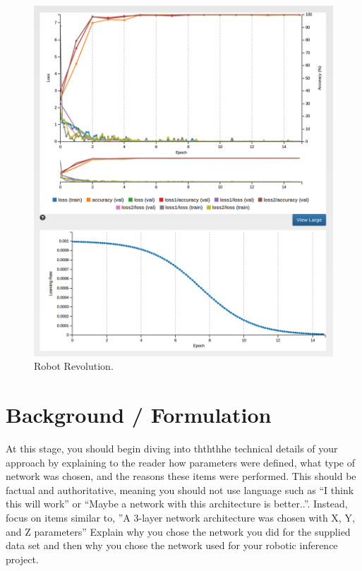 \documentclass[10pt,journal,compsoc]{IEEEtran}
\begin{document}
\begin{figure}[thpb]
      \centering
      \includegraphics[width=\linewidth]{15_epoch_googlenet_sigmoidecay}
      \caption{Robot Revolution.}
      \label{fig:robot1}
\end{figure}

\section{Background / Formulation}
At this stage, you should begin diving into thththhe technical details of your approach by explaining to the reader how parameters were defined, what type of network was chosen, and the reasons these items were performed. This should be factual and authoritative, meaning you should not use language such as “I think this will work” or “Maybe a network with this architecture is better..”. Instead, focus on items similar to, ”A 3-layer network architecture was chosen with X, Y, and Z parameters” 
Explain why you chose the network you did for the supplied data set and then why you chose the network used for your robotic inference project. \cite{lamport1994latex}
\end{document}
